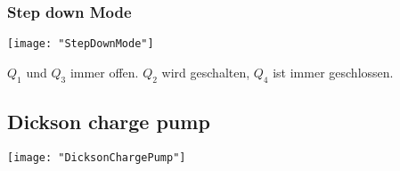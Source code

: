 
\subsubsection{Step down Mode}
\begin{minipage}[t]{0.3\textwidth}
	\vspace{0pt}								%
	\texttt{[image: "StepDownMode"]}
\end{minipage}\hspace{0.05\textwidth}
\begin{minipage}[t]{0.65\textwidth}
	\vspace{0pt}
	$Q_1$ und $Q_3$ immer offen. $Q_2$ wird geschalten, $Q_4$ ist immer geschlossen.
\end{minipage}
\vspace{2mm}


\subsection{Dickson charge pump}
\begin{minipage}[t]{0.3\textwidth}
	\vspace{0pt}								%
	\texttt{[image: "DicksonChargePump"]}
\end{minipage}\hspace{0.05\textwidth}
\begin{minipage}[t]{0.65\textwidth}
	\vspace{0pt}
\end{minipage}
\vspace{2mm}